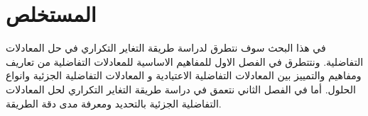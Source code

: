 \chapter*{المستخلص}

في هذا البحث سوف نتطرق لدراسة طريقة التغاير التكراري في حل المعادلات التفاضلية. ونتتطرق في الفصل الاول للمفاهيم الاساسية للمعادلات التفاضلية من تعاريف ومفاهيم والتمييز بين المعادلات التفاضلية الاعتيادية و المعادلات التفاضلية الجزئية وانواع الحلول. أما في الفصل الثاني نتعمق في دراسة  طريقة التغاير التكراري لحل المعادلات التفاضلية الجزئية بالتحديد ومعرفة مدى دقة الطريقة.
